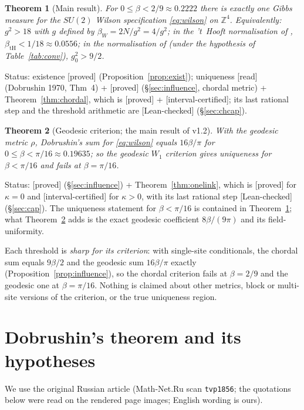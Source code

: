 \documentclass[11pt,a4paper]{article}
\newtheorem{theorem}{Theorem}
\theoremstyle{remark}
\theoremstyle{definition}
\newcommand{\Z}{\mathbb{Z}}
\newcommand{\st}[1]{\textsf{[#1]}}
\begin{document}
\begin{theorem}[Main result]\label{thm:main}
For $0\le\beta<2/9\approx0.2222$ there is exactly one Gibbs measure for the $SU(2)$ Wilson
specification \eqref{eq:wilson} on $\Z^4$.
Equivalently: $g^2>18$ with $g$ defined by $\beta_W=2N/g^2=4/g^2$; in the 't~Hooft normalisation of
\cite{SZZ23}, $\beta_{\mathrm{tH}}<1/18\approx0.0556$; in the normalisation of \cite{OS78} (under the hypothesis
of Table~\ref{tab:conv}), $g_0^2>9/2$.
\end{theorem}
\noindent Status: existence \st{proved} (Proposition~\ref{prop:exist});
uniqueness \st{read} (Dobrushin 1970, Thm~4) + \st{proved} (\S\ref{sec:influence}, chordal metric) +
Theorem~\ref{thm:chordal}, which is \st{proved} + \st{interval-certified}; its last rational step and the
threshold arithmetic are \st{Lean-checked} (\S\ref{sec:chcap}).

\begin{theorem}[Geodesic criterion; the main result of v1.2]\label{thm:geo}
With the geodesic metric $\rho$, Dobrushin's sum for \eqref{eq:wilson} equals $16\beta/\pi$ for
$0\le\beta<\pi/16\approx0.19635$; so the geodesic $W_1$ criterion gives uniqueness for $\beta<\pi/16$ and fails at
$\beta=\pi/16$.
\end{theorem}
\noindent Status: \st{proved} (\S\ref{sec:influence}) + Theorem~\ref{thm:onelink}, which is \st{proved} for
$\kappa=0$ and \st{interval-certified} for $\kappa>0$, with its last rational step \st{Lean-checked}
(\S\ref{sec:cap}). The uniqueness statement for $\beta<\pi/16$ is contained in Theorem~\ref{thm:main}; what
Theorem~\ref{thm:geo} adds is the exact geodesic coefficient $8\beta/(9\pi)$ and its field-uniformity.

Each threshold is \emph{sharp for its criterion}: with single-site conditionals, the chordal sum equals $9\beta/2$
and the geodesic sum $16\beta/\pi$ exactly (Proposition~\ref{prop:influence}), so the chordal criterion fails at
$\beta=2/9$ and the geodesic one at $\beta=\pi/16$. Nothing is claimed about other metrics, block or multi-site
versions of the criterion, or the true uniqueness region.

\section{Dobrushin's theorem and its hypotheses}\label{sec:dobrushin}

We use the original Russian article \cite{Dob70} (Math-Net.Ru scan \texttt{tvp1856}; the
quotations below were read on the rendered page images; English wording is ours).
\end{document}
